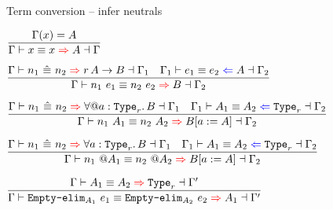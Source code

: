 \begin{frame}{Term conversion -- infer neutrals}

\begin{center}
  $\infrule{\findvar{\Gamma}{x}{A}}{\infertermconv{\Gamma}{x}{x}{A}{\Gamma}}$

  \vspace{2em}

  $\infrule{\infertermconvwhnf{\Gamma}{n_1}{n_2}{\Fun[r]{A}{B}}{\Gamma_1} \quad \checktermconv{\Gamma_1}{e_1}{e_2}{A}{\Gamma_2}}{\infertermconv{\Gamma}{\app{n_1}{e_1}}{\app{n_2}{e_2}}{B}{\Gamma_2}}$

  \vspace{2em}

  $\infrule{\infertermconvwhnf{\Gamma}{n_1}{n_2}{\ForallE{a}[r]{B}}{\Gamma_1} \quad \checktypeconv{\Gamma_1}{A_1}{A_2}[r]{\Gamma_2}}{\infertermconv{\Gamma}{\tapp{n_1}{A_1}}{\tapp{n_2}{A_2}}{\subst{B}{a}{A}}{\Gamma_2}}$

  \vspace{2em}

  $\infrule{\infertermconvwhnf{\Gamma}{n_1}{n_2}{\ForallI{a}[r]{B}}{\Gamma_1} \quad \checktypeconv{\Gamma_1}{A_1}{A_2}[r]{\Gamma_2}}{\infertermconv{\Gamma}{\itapp{n_1}{A_1}}{\itapp{n_2}{A_2}}{\subst{B}{a}{A}}{\Gamma_2}}$

  \vspace{2em}

  $\infrule{\infertypeconv{\Gamma}{A_1}{A_2}[r]{\Gamma'}}{\infertermconv{\Gamma}{\emptyelim{e_1}[A_1]}{\emptyelim{e_2}[A_2]}{A_1}{\Gamma'}}$
\end{center}

\end{frame}

